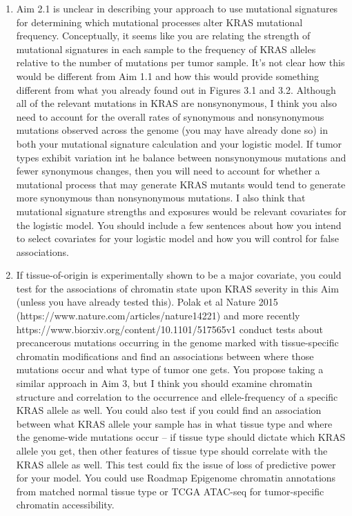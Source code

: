 {\color{red} 

\begin{enumerate}
\item Aim 2.1 is unclear in describing your approach to use mutational signatures for determining which mutational processes alter KRAS mutational frequency. Conceptually, it seems like you are relating the strength of mutational signatures in each sample to the frequency of KRAS alleles relative to the number of mutations per tumor sample. It's not clear how this would be different from Aim 1.1 and how this would provide something different from what you already found out in Figures 3.1 and 3.2. Although all of the relevant mutations in KRAS are nonsynonymous, I think you also need to account for the overall rates of synonymous and nonsynonymous mutations observed across the genome (you may have already done so) in both your mutational signature calculation and your logistic model. If tumor types exhibit variation int he balance between nonsynonymous mutations and fewer synonymous changes, then you will need to account for whether a mutational process that may generate KRAS mutants would tend to generate more synonymous than nonsynonymous mutations. I also think that mutational signature strengths and exposures would be relevant covariates for the logistic model. You should include a few sentences about how you intend to select covariates for your logistic model and how you will control for false associations.

\item If tissue-of-origin is experimentally shown to be a major covariate, you could test for the associations of chromatin state upon KRAS severity in this Aim (unless you have already tested this). Polak et al Nature 2015 (https://www.nature.com/articles/nature14221) and more recently https://www.biorxiv.org/content/10.1101/517565v1 conduct tests about precancerous mutations occurring in the genome marked with tissue-specific chromatin modifications and find an associations between where those mutations occur and what type of tumor one gets. You propose taking a similar approach in Aim 3, but I think you should examine chromatin structure and correlation to the occurrence and ellele-frequency of a specific KRAS allele as well. You could also test if you could find an association between what KRAS allele your sample has in what tissue type and where the genome-wide mutations occur -- if tissue type should dictate which KRAS allele you get, then other features of tissue type should correlate with the KRAS allele as well. This test could fix the issue of loss of predictive power for your model. You could use Roadmap Epigenome chromatin annotations from matched normal tissue type or TCGA ATAC-seq for tumor-specific chromatin accessibility. 


\end{enumerate}}
